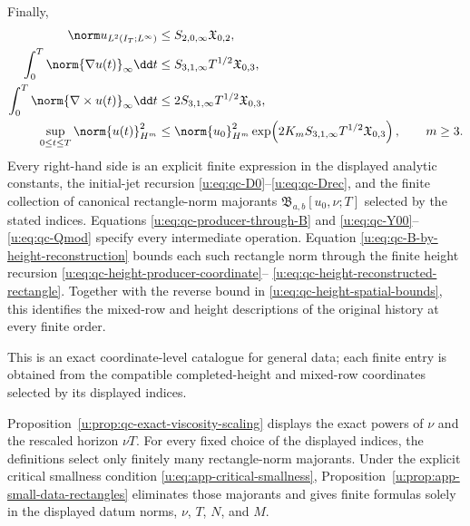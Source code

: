 {\begin{theorem}
Finally,
\begin{align}
 \norm u_{L^2(I_T;L^\infty)}
 &\le S_{2,0,\infty}\mathfrak X_{0,2},
 \label{u:eq:qc-sharp-L2Linfty}\\
 \int_0^T\norm{\nabla u(t)}_\infty\dd t
 &\le S_{3,1,\infty}T^{1/2}\mathfrak X_{0,3},
 \label{u:eq:qc-sharp-lipschitz-action}\\
 \int_0^T\norm{\nabla\times u(t)}_\infty\dd t
 &\le2S_{3,1,\infty}T^{1/2}\mathfrak X_{0,3},
 \label{u:eq:qc-sharp-vorticity-action}\\
 \sup_{0\le t\le T}\norm{u(t)}_{H^m}^2
 &\le\norm{u_0}_{H^m}^2
 \exp\!\left(
 2K_mS_{3,1,\infty}T^{1/2}\mathfrak X_{0,3}
 \right),
 \qquad m\ge3.
 \label{u:eq:qc-sharp-continuation-growth}
\end{align}
Every right-hand side is an explicit finite expression in the displayed
analytic constants, the initial-jet recursion
\eqref{u:eq:qc-D0}--\eqref{u:eq:qc-Drec}, and the finite collection of canonical
rectangle-norm majorants \(\mathfrak B_{a,b}[u_0,\nu;T]\) selected by the stated
indices.  Equations \eqref{u:eq:qc-producer-through-B} and
\eqref{u:eq:qc-Y00}--\eqref{u:eq:qc-Qmod} specify every intermediate operation.
Equation \eqref{u:eq:qc-B-by-height-reconstruction} bounds each such
rectangle norm through the finite height recursion
\eqref{u:eq:qc-height-producer-coordinate}--%
\eqref{u:eq:qc-height-reconstructed-rectangle}.  Together with the reverse
bound in \eqref{u:eq:qc-height-spatial-bounds}, this identifies the mixed-row
and height descriptions of the original history at every finite order.
\begin{samepage}
This is an exact coordinate-level catalogue for general data; each finite
entry is obtained from the compatible completed-height and mixed-row
coordinates selected by its displayed indices.\par
\end{samepage}
Proposition~\ref{u:prop:qc-exact-viscosity-scaling} displays the exact powers of
\(\nu\) and the rescaled horizon \(\nu T\).  For every fixed choice of the
displayed indices, the definitions select only finitely many rectangle-norm
majorants.
Under the explicit critical smallness condition
\eqref{u:eq:app-critical-smallness}, Proposition~\ref{u:prop:app-small-data-rectangles}
eliminates those majorants and gives finite formulas solely in the
displayed datum norms, \(\nu\), \(T\), \(N\), and \(M\).
\end{theorem}

}
